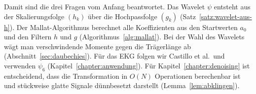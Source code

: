 \documentclass[a4paper,11pt,bibliography=totoc,listof=totoc,headinclude=true,cleardoublepage=empty,oneside]{scrbook}
\theoremstyle{plain}
\theoremstyle{definition}
\begin{document}
Damit sind die drei Fragen vom Anfang beantwortet. Das Wavelet $\psi$ entsteht
aus der Skalierungsfolge $(h_k)$ über die Hochpassfolge $(g_k)$
(Satz~\ref{satz:wavelet-aus-h}). Der Mallat-Algorithmus berechnet alle
Koeffizienten aus den Startwerten $a_0$ und den Filtern $h$ und $g$
(Algorithmus~\ref{alg:mallat}). Bei der Wahl des Wavelets wägt man
verschwindende Momente gegen die Trägerlänge ab (Abschnitt~\ref{sec:daubechies}).
Für das EKG folgen wir Castillo et al.\ und verwenden $\psi_6$
(Kapitel~\ref{chapter:anwendung}). Für Kapitel~\ref{chapter:denoising} ist entscheidend, dass die Transformation in
$O(N)$ Operationen berechenbar ist und stückweise glatte Signale dünnbesetzt
darstellt (Lemma~\ref{lem:abklingen}).

\end{document}
